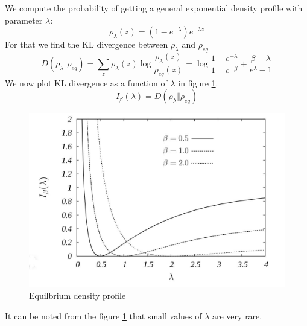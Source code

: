 \documentclass[letterpaper,english,12pt]{article}
\begin{document}
\begin{exmp}
 We compute the probability of getting a general exponential density profile with parameter $\lambda$:
 \begin{equation}
 	\rho_{\lambda}(z)= (1-e^{-\lambda})e^{-\lambda z}
 \end{equation}
 For that we find the KL divergence between $\rho_{\lambda}$ and $\rho_{eq}$
 \begin{equation}
     D(\rho_{\lambda} \Vert \rho_{eq}) = 
     \sum_{z}^{} \rho_{\lambda}(z) \log \frac{\rho_{\lambda}(z)}{\rho_{eq}(z)} =     
     \log{  \frac{1-e^{-\lambda}}{1-e^{-\beta}}  + \frac{\beta -\lambda}{e^{\lambda}-1}}
 \end{equation}
 We now plot KL divergence as a function of $\lambda$ in figure \ref{fig:Earthatmo}.
 \begin{equation}
 	I_{\beta}(\lambda)= D(\rho_{\lambda} \Vert \rho_{eq})
 \end{equation}
 \begin{figure}[h!] \label{fig}
  \includegraphics[width=\linewidth]{EarthAtmo.jpeg}
  \caption{Equilbrium density profile}
  \label{fig:Earthatmo}
\end{figure}
It can be noted from the figure \ref{fig:Earthatmo} that small values of $\lambda$ are very rare.
 \end{exmp}
\end{document}
